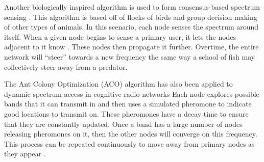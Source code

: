 Another biologically inspired algorithm is used to form consensus-based spectrum sensing \cite{5464224}. This algorithm is based off of flocks of birds and group decision making of other types of animals. In this scenario, each node senses the spectrum around itself. When a given node begins to sense a primary user, it lets the nodes adjacent to it know \cite{5464224}. These nodes then propagate it further. Overtime, the entire network will ``steer'' towards a new frequency the same way a school of fish may collectively steer away from a predator. 


The Ant Colony Optimization (ACO) algorithm has also been applied to dynamic spectrum access in cognitive radio networks \cite{5600815} Each node explores possible bands that it can transmit in and then uses a simulated pheromone to indicate good locations to transmit on. These pheromones have a decay time to ensure that they are constantly updated. Once a band has a large number of nodes releasing pheromones on it, then the other nodes will converge on this frequency. This process can be repeated continuously to move away from primary nodes as they appear \cite{5600815}. 
